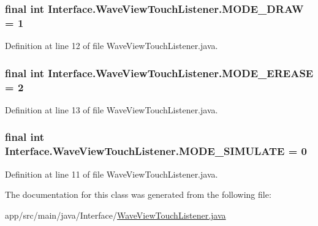 \subsubsection[{\texorpdfstring{M\+O\+D\+E\+\_\+\+D\+R\+AW}{MODE_DRAW}}]{\setlength{\rightskip}{0pt plus 5cm}final int Interface.\+Wave\+View\+Touch\+Listener.\+M\+O\+D\+E\+\_\+\+D\+R\+AW = 1\hspace{0.3cm}{\ttfamily [static]}}\hypertarget{classInterface_1_1WaveViewTouchListener_a3811bd2e74d73f7ee8670d7b296be3b9}{}\label{classInterface_1_1WaveViewTouchListener_a3811bd2e74d73f7ee8670d7b296be3b9}


Definition at line 12 of file Wave\+View\+Touch\+Listener.\+java.

\subsubsection[{\texorpdfstring{M\+O\+D\+E\+\_\+\+E\+R\+E\+A\+SE}{MODE_EREASE}}]{\setlength{\rightskip}{0pt plus 5cm}final int Interface.\+Wave\+View\+Touch\+Listener.\+M\+O\+D\+E\+\_\+\+E\+R\+E\+A\+SE = 2\hspace{0.3cm}{\ttfamily [static]}}\hypertarget{classInterface_1_1WaveViewTouchListener_a1bc39f00673017b4aa37c97c34d227da}{}\label{classInterface_1_1WaveViewTouchListener_a1bc39f00673017b4aa37c97c34d227da}


Definition at line 13 of file Wave\+View\+Touch\+Listener.\+java.

\subsubsection[{\texorpdfstring{M\+O\+D\+E\+\_\+\+S\+I\+M\+U\+L\+A\+TE}{MODE_SIMULATE}}]{\setlength{\rightskip}{0pt plus 5cm}final int Interface.\+Wave\+View\+Touch\+Listener.\+M\+O\+D\+E\+\_\+\+S\+I\+M\+U\+L\+A\+TE = 0\hspace{0.3cm}{\ttfamily [static]}}\hypertarget{classInterface_1_1WaveViewTouchListener_ae3013008090c3927bf0dce7d619f9e79}{}\label{classInterface_1_1WaveViewTouchListener_ae3013008090c3927bf0dce7d619f9e79}


Definition at line 11 of file Wave\+View\+Touch\+Listener.\+java.



The documentation for this class was generated from the following file\+:\begin{DoxyCompactItemize}
\item 
app/src/main/java/\+Interface/\hyperlink{WaveViewTouchListener_8java}{Wave\+View\+Touch\+Listener.\+java}\end{DoxyCompactItemize}
